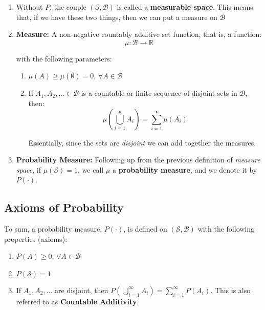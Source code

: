 \documentclass{article}
\begin{document}
\begin{enumerate}
\begin{enumerate}
    \end{enumerate}
    
    \item Without $P$, the couple $(\mathcal{S},\mathcal{B})$ is called a \textbf{measurable space}. This means that, if we have these two things, then we can put a measure on $\mathcal{B}$
    
    \item \textbf{Measure:} A non-negative countably additive set function, that is, a function:
    \begin{equation*}
        \mu: \mathcal{B} \rightarrow \mathbb{R}
    \end{equation*}
    
    with the following parameters:
    \begin{enumerate}
        \item $\mu(A) \geq \mu(\emptyset)=0$, $\forall A \in \mathcal{B}$
        \item If $A_1, A_2,... \in \mathcal{B}$ is a countable or finite sequence of disjoint sets in $\mathcal{B}$, then:
        \begin{equation*}
            \mu\left(\bigcup\limits_{i=1}^{\infty} A_{i}\right) = \sum\limits_{i=1}^\infty \mu(A_i)
        \end{equation*}
        
        Essentially, since the sets are \textit{disjoint} we can add together the measures. 
    \end{enumerate}
    \item \textbf{Probability Measure:} Following up from the previous definition of \textit{measure space}, if $\mu(\mathcal{S}) = 1$, we call $\mu$ a \textbf{probability measure}, and we denote it by $P(\cdot)$.
\end{enumerate}
    
    \subsection{Axioms of Probability}
    
    To sum, a probability measure, $P(\cdot)$, is defined on $(\mathcal{S},\mathcal{B})$ with the following properties (axioms):
    \begin{enumerate}
        \item $P(A) \geq 0$, $\forall A \in \mathcal{B}$
        \item $P(\mathcal{S}) = 1$
        \item If $A_1, A_2,...$ are disjoint, then $P(\bigcup\limits_{i=1}^{\infty} A_{i}) = \sum\limits_{i=1}^\infty P(A_i)$. This is also referred to as \textbf{Countable Additivity}.
    \end{enumerate}
\end{document}
